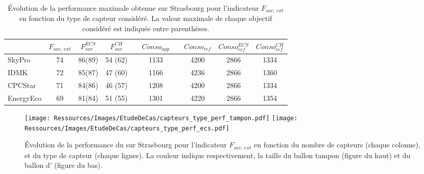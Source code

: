 \begin{table}
\centering
\caption[Performance maximale pouvant être obtenue pour les différents capteurs solaires sur Strasbourg]
         {Évolution de la performance maximale obtenue sur Strasbourg pour l’indicateur
          $F_{sav,\, ext}$ en fonction du type de capteur considéré. La valeur maximale
          de chaque objectif considéré est indiquée entre parenthèses.}
\label{tab:capteur_perf_variation}
\begin{tabular}{l c c c c c c c c c}
    \toprule
              & $F_{sav,\,ext}$ & $F_{sav}^{ECS}$ & $F_{sav}^{CH}$ & &  $Conso_{app}$ & & $Conso_{ref}$ & $Conso_{ref}^{ECS}$ & $Conso_{ref}^{CH}$ \\
    \midrule
    SkyPro    & \num{74} & \num{86}(\num{89}) & \num{54} (\num{62}) & & \num{1133} & & \num{4200} & \num{2866} & \num{1334} \\
    IDMK      & \num{72} & \num{85}(\num{87}) & \num{47} (\num{60}) & & \num{1166} & & \num{4236} & \num{2866} & \num{1360} \\
    CPCStar   & \num{71} & \num{84}(\num{86}) & \num{46} (\num{57}) & & \num{1208} & & \num{4200} & \num{2866} & \num{1334} \\
    EnergyEco & \num{69} & \num{81}(\num{84}) & \num{51} (\num{55}) & & \num{1301} & & \num{4220} & \num{2866} & \num{1354} \\
    \bottomrule
\end{tabular}
\end{table}


\begin{figure}
    \centering
    \texttt{[image: Ressources/Images/EtudeDeCas/capteurs\_type\_perf\_tampon.pdf]}
    \texttt{[image: Ressources/Images/EtudeDeCas/capteurs\_type\_perf\_ecs.pdf]}
    \caption[Évolution de la performance du  en fonction du type de capteurs sur Strasbourg]
             {Évolution de la performance du  sur Strasbourg pour l’indicateur $F_{sav,\,ext}$
              en fonction du nombre de capteurs (chaque colonne), et du type de capteur
              (chaque lignes). La couleur indique respectivement, la taille
              du ballon tampon (figure du haut) et du ballon d’ (figure du bas).}
    \label{fig:evolution_type_capteurs}
\end{figure}

